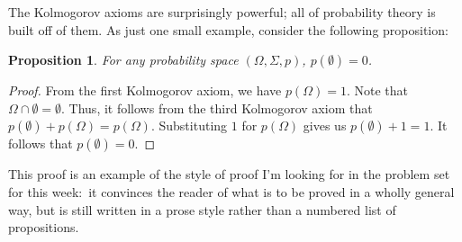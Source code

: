 \documentclass[11pt]{article}
\newtheorem{proposition}[theorem]{Proposition}
\theoremstyle{definition}
\theoremstyle{remark}
\begin{document}
The Kolmogorov axioms are surprisingly powerful; all of probability theory is built off of them. As just one small example, consider the following proposition:
\begin{proposition}
    For any probability space $(\Omega,\Sigma,p)$, $p(\emptyset)=0$.
\end{proposition}
\begin{proof}
    From the first Kolmogorov axiom, we have $p(\Omega)=1$. Note that $\Omega\cap\emptyset=\emptyset$. Thus, it follows from the third Kolmogorov axiom that $p(\emptyset)+p(\Omega)=p(\Omega)$. Substituting $1$ for $p(\Omega)$ gives us $p(\emptyset)+1=1$. It follows that $p(\emptyset)=0$.
\end{proof}
\noindent
This proof is an example of the style of proof I'm looking for in the problem set for this week:\ it convinces the reader of what is to be proved in a wholly general way, but is still written in a prose style rather than a numbered list of propositions.\par 
\end{document}

